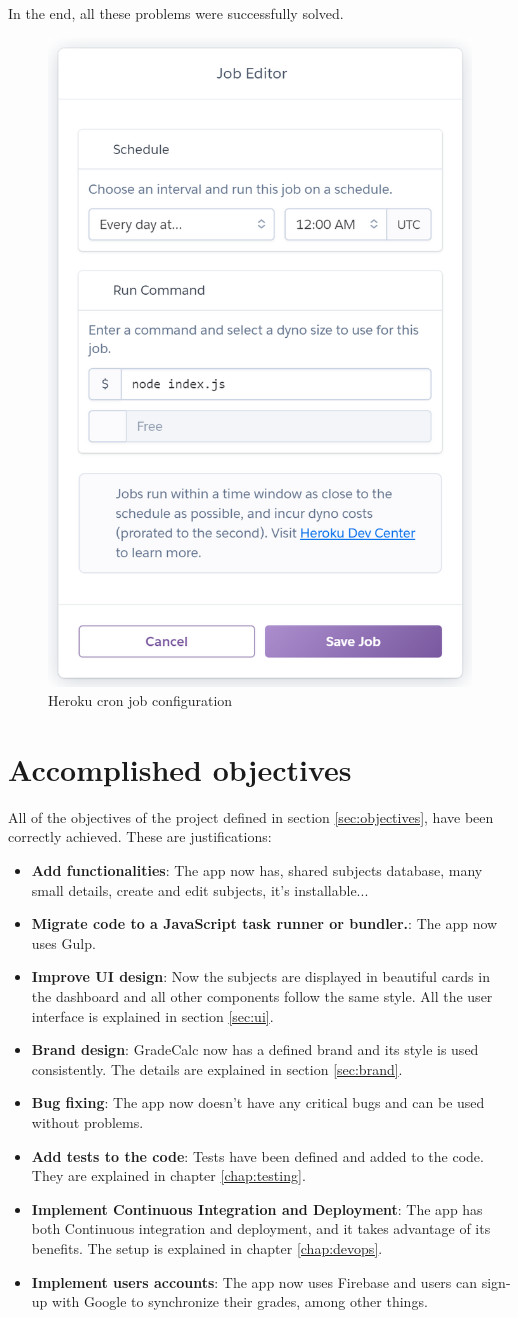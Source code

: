 \noindent
In the end, all these problems were successfully solved.

\vfill
\begin{figure}[h!]
    \center
    \includegraphics[width=0.35\linewidth]{media/heroku.png}
    \caption{Heroku cron job configuration}
\end{figure}
\vfill

\clearpage\newpage
\section{Accomplished objectives}

All of the objectives of the project defined in section \ref{sec:objectives}, have been correctly achieved. These are justifications:
\begin{itemize}
    \item \textbf{Add functionalities}: 
        The app now has, shared subjects database, many small details, create and edit subjects, it's installable...
    \item \textbf{Migrate code to a JavaScript task runner or bundler.}: 
        The app now uses Gulp.
    \item \textbf{Improve UI design}: 
        Now the subjects are displayed in beautiful cards in the dashboard and all other components follow the same style. All the user interface is explained in section \ref{sec:ui}.
    \item \textbf{Brand design}: 
        GradeCalc now has a defined brand and its style is used consistently. The details are explained in section \ref{sec:brand}.
    \item \textbf{Bug fixing}: 
        The app now doesn't have any critical bugs and can be used without problems.
    \item \textbf{Add tests to the code}: 
        Tests have been defined and added to the code. They are explained in chapter \ref{chap:testing}.
    \item \textbf{Implement Continuous Integration and Deployment}: 
        The app has both Continuous integration and deployment, and it takes advantage of its benefits. The setup is explained in chapter \ref{chap:devops}.
    \item \textbf{Implement users accounts}: 
        The app now uses Firebase and users can sign-up with Google to synchronize their grades, among other things. 
\end{itemize}




